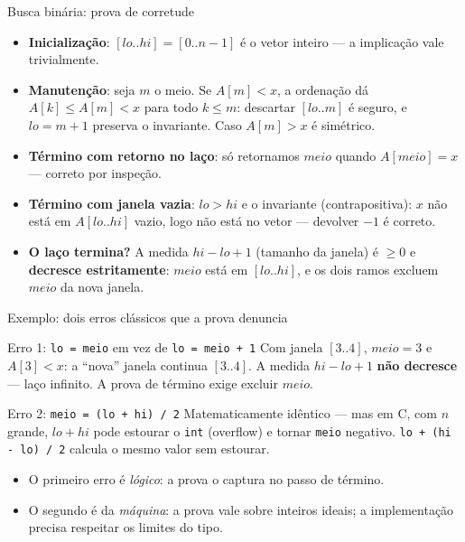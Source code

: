 \documentclass[aspectratio=169]{beamer}
\begin{document}
\begin{frame}{Busca binária: prova de corretude}
  \begin{itemize}
    \item \textbf{Inicialização}: $[lo..hi] = [0..n-1]$ é o vetor inteiro ---
      a implicação vale trivialmente. \checkmark
    \item \textbf{Manutenção}: seja $m$ o meio. Se $A[m] < x$, a ordenação dá
      $A[k] \leq A[m] < x$ para todo $k \leq m$: descartar $[lo..m]$ é seguro, e
      $lo = m + 1$ preserva o invariante. Caso $A[m] > x$ é simétrico. \checkmark
    \item \textbf{Término com retorno no laço}: só retornamos $meio$ quando
      $A[meio] = x$ --- correto por inspeção. \checkmark
    \item \textbf{Término com janela vazia}: $lo > hi$ e o invariante
      (contrapositiva): $x$ não está em $A[lo..hi]$ vazio, logo não está no vetor
      --- devolver $-1$ é correto. \checkmark
    \item \textbf{O laço termina?} A medida $hi - lo + 1$ (tamanho da janela) é
      $\geq 0$ e \textbf{decresce estritamente}: $meio$ está em $[lo..hi]$, e os dois
      ramos excluem $meio$ da nova janela. \checkmark
  \end{itemize}
\end{frame}

\begin{frame}[fragile]{Exemplo: dois erros clássicos que a prova denuncia}
  \begin{exampleblock}{Erro 1: \texttt{lo = meio} em vez de \texttt{lo = meio + 1}}
    Com janela $[3..4]$, $meio = 3$ e $A[3] < x$: a ``nova'' janela continua $[3..4]$.
    A medida $hi - lo + 1$ \textbf{não decresce} --- laço infinito. A prova de término
    exige excluir $meio$.
  \end{exampleblock}
  \begin{exampleblock}{Erro 2: \texttt{meio = (lo + hi) / 2}}
    Matematicamente idêntico --- mas em C, com $n$ grande, $lo + hi$ pode estourar o
    \texttt{int} (overflow) e tornar \texttt{meio} negativo.
    \texttt{lo + (hi - lo) / 2} calcula o mesmo valor sem estourar.
  \end{exampleblock}
  \begin{itemize}
    \item O primeiro erro é \emph{lógico}: a prova o captura no passo de término.
    \item O segundo é da \emph{máquina}: a prova vale sobre inteiros ideais; a
      implementação precisa respeitar os limites do tipo.
  \end{itemize}
\end{frame}
\end{document}
